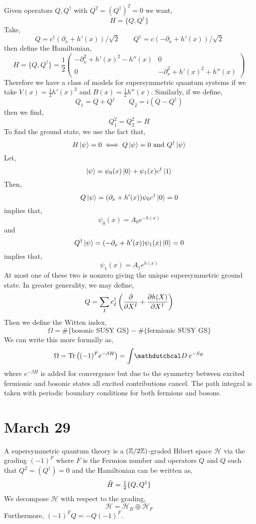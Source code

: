 \documentclass[12pt]{extarticle}
\begin{document}
Given operators $Q, Q^\dagger$ with $Q^2 = (Q^\dagger)^2 = 0$ we want,
\[ H = \{ Q, Q^\dagger \} \]
Take,
\[ Q = c^\dagger (\partial_x + h'(x)) / \sqrt{2} \quad \quad Q^\dagger = c( -\partial_x + h'(x)) / \sqrt{2} \]
then define the Hamiltonian,
\[ H = \{ Q, Q^\dagger \} = \frac{1}{2} \begin{pmatrix}
- \partial_x^2 + h'(x)^2 - h''(x) & 0 
\\
0 & - \partial_x^2 + h'(x)^2 + h''(x) 
\end{pmatrix} \]
Therefore we have a class of models for supersymmetric quantum systems if we take $V(x) = \tfrac{1}{2} h'(x)^2$ and $B(x) = \tfrac{1}{2} h''(x)$. Similarly, if we define,
\[ Q_1 = Q + Q^\dagger \quad \quad Q_2 = i(Q - Q^\dagger) \]
then we find,
\[ Q_1^2 = Q_2^2 = H \]
To find the ground state, we use the fact that,
\[ H \left| \psi \right> = 0 \iff Q \left| \psi \right> = 0 \text{ and } Q^\dagger \left| \psi \right> \]
Let,
\[ \left| \psi \right> = \psi_0(x) \left| 0 \right> + \psi_1(x) c^\dagger \left| 1 \right> \]
Then,
\[ Q \left| \psi \right> = (\partial_x + h'(x)) \psi_0 c^\dagger \left| 0 \right> = 0 \]
implies that,
\[ \psi_0(x) = A_0 e^{- h(x)} \]
and 
\[ Q^\dagger \left| \psi \right> = (-\partial_x + h'(x)) \psi_1(x) \left| 0 \right> = 0\]
implies that,
\[ \psi_1(x) = A_1 e^{h(x)} \]
At most one of these two is nonzero giving the unique supersymmetric ground state. In greater generality, we may define,
\[ Q = \sum_I c_I^\dagger \left( \frac{\partial{}}{\partial{X^I}} + \frac{\partial{h(X)}}{\partial{X^I}} \right) \]
Then we define the Witten index,
\[ \Omega = \# \{ \text{bosonic SUSY GS} \} - \# \{ \text{fermionic SUSY GS} \} \]
We can write this more formally as,
\[ \Omega = \Tr{(-1)^F e^{-\beta H}} = \int \pathd{} e^{-S_E}  \] 
where $e^{-\beta H}$ is added for convergence but due to the symmetry between excited fermionic and bosonic states all excited contributions cancel. The path integral is taken with periodic boundary conditions for both fermions and bosons. 

\section{March 29}

\renewcommand{\H}{\mathcal{H}}
\newcommand{\id}{\mathrm{id}}

\begin{definition}
A supersymmetric quantum theory is a $(\mathbb{Z} / 2 \mathbb{Z})$-graded Hibert space $\H$ via the grading $(-1)^F$ where $F$ is the Fermion number and operators $Q$ and $Q$ such that $Q^2 = (Q^\dagger) = 0$ and the Hamiltonian can be written as,
\[ \hat{H} = \tfrac{1}{2} \{ Q, Q^\dagger \} \] 
We decompose $\H$ with respect to the grading,
\[ \H = \H_B \oplus \H_F \]
Furthermore, $(-1)^F Q =  -Q(-1)^F$.
\end{definition}
\end{document}
